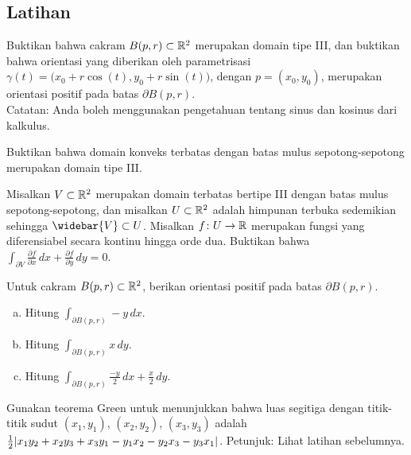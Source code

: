 \subsection{Latihan}

\begin{exercise} \label{green:balltype3orient}
Buktikan bahwa cakram $B(p,r) \subset {\mathbb{R}}^2$ merupakan domain tipe III, dan
buktikan bahwa orientasi yang diberikan oleh parametrisasi $\gamma(t) =
\bigl(x_0+r\cos(t),y_0+r\sin(t)\bigr)$, dengan $p = (x_0,y_0)$, merupakan
orientasi positif pada batas $\partial B(p,r)$.
\\
Catatan: Anda boleh menggunakan pengetahuan tentang sinus dan kosinus dari kalkulus.
\end{exercise}

\begin{exercise}
Buktikan bahwa domain konveks terbatas dengan batas mulus sepotong-sepotong
merupakan domain tipe III.
\end{exercise}

\begin{exercise}
Misalkan $V \subset {\mathbb{R}}^2$ merupakan domain terbatas bertipe III dengan batas
mulus sepotong-sepotong, dan misalkan $U \subset {\mathbb{R}}^2$ adalah himpunan terbuka
sedemikian sehingga $\widebar{V} \subset U$. Misalkan $f \colon U \to {\mathbb{R}}$
merupakan fungsi yang diferensiabel secara kontinu hingga orde dua. Buktikan bahwa
$\int_{\partial V}
\frac{\partial f}{\partial x} \, dx + 
\frac{\partial f}{\partial y} \, dy = 0$.
\end{exercise}

\begin{samepage}
\begin{exercise}
Untuk cakram $B(p,r) \subset {\mathbb{R}}^2$, berikan orientasi positif pada batas
$\partial B(p,r)$.
\begin{enumerate}[a)]
\item
Hitung $\displaystyle \int_{\partial B(p,r)} -y \, dx$.
\item
Hitung $\displaystyle \int_{\partial B(p,r)} x \, dy$.
\item
Hitung $\displaystyle \int_{\partial B(p,r)} \frac{-y}{2} \, dx +
\frac{x}{2} \, dy$.
\end{enumerate}
\end{exercise}
\end{samepage}

\begin{exercise}
Gunakan teorema Green untuk menunjukkan bahwa luas segitiga dengan
titik-titik sudut
$(x_1,y_1)$,
$(x_2,y_2)$,
$(x_3,y_3)$ adalah
$\frac{1}{2}\lvert {x_1y_2 + x_2 y_3 + x_3 y_1 - y_1x_2 - y_2x_3 - y_3x_1} \rvert$.
Petunjuk: Lihat latihan sebelumnya.
\end{exercise}

